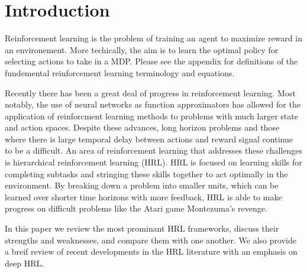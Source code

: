 \section{Introduction}
Reinforcement learning is the problem of training an agent to maximize reward in an environement.
More techically, the aim is to learn the optimal policy for selecting actions to take in a MDP.
Please see the appendix for definitions of the fundemental reinforcement learning terminology
and equations.

Recently there has been a great deal of progress in reinforcement learning. Most notably,
the use of neural networks as function approximators has allowed for the application of
reinforcment learning methods to problems with much larger state and action spaces.
Despite these advances, long horizon problems  and those where there is large temporal delay between actions and reward signal continue to be a difficult.
An area of reinforcement learning that addresses these challenges is hierarchical reinforcement learning (HRL).
HRL is focused on learning skills for completing subtasks and stringing these skills
together to act optimally in the environment. By breaking down a problem into smaller units, which can be learned
over shorter time horizons with more feedback, HRL is able to make progress on difficult
problems like the Atari game Montezuma's revenge.

In this paper we review the most prominant HRL frameworks, discuss their strengths and
weaknesses, and compare them with one another. We also provide a breif review of recent developments in the
HRL literature with an emphasis on deep HRL.

